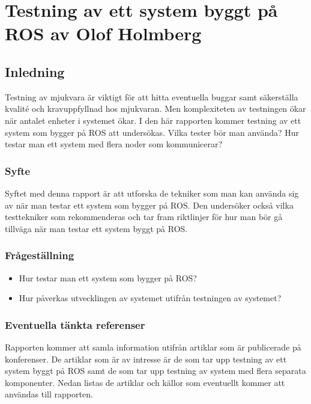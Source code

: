 \chapter{Testning av ett system byggt på ROS av Olof Holmberg}
\label{cha:indiv-report-holmberg}

\section{Inledning}
\label{sec:introduction-holmberg}

Testning av mjukvara är viktigt för att hitta eventuella buggar samt säkerställa kvalité och kravuppfyllnad hos mjukvaran. Men komplexiteten av testningen ökar när antalet enheter i systemet ökar. I den här rapporten kommer testning av ett system som bygger på ROS att undersökas. Vilka tester bör man använda? Hur testar man ett system med flera noder som kommunicerar?

\subsection{Syfte}
\label{sec:purpose-holmberg}

Syftet med denna rapport är att utforska de tekniker som man kan använda sig av när man testar ett system som bygger på ROS. Den undersöker också vilka testtekniker som rekommenderas och tar fram riktlinjer för hur man bör gå tillväga när man testar ett system byggt på ROS.

\subsection{Frågeställning}
\label{sec:issue-holmberg}

\begin{itemize}
	\item Hur testar man ett system som bygger på ROS?
	\item Hur påverkas utvecklingen av systemet utifrån testningen av systemet?
\end{itemize}

\subsection{Eventuella tänkta referenser}

Rapporten kommer att samla information utifrån artiklar som är publicerade på konferenser. De artiklar som är av intresse är de som tar upp testning av ett system byggt på ROS samt de som tar upp testning av system med flera separata komponenter. Nedan listas de artiklar och källor som eventuellt kommer att användas till rapporten.

